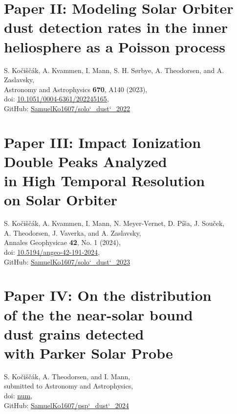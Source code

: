 \documentclass[11pt,twoside,openright]{book}
\begin{document}
\chapter[Paper II: Modeling Solar Orbiter dust detection rates in the inner heliosphere as a Poisson process]{Paper II: Modeling Solar Orbiter dust detection rates in the inner heliosphere as a Poisson process}
S. Ko{\v{c}}i{\v{s}}{\v{c}}{\'a}k, A. Kvammen, I. Mann, S. H. S{\o}rbye, A. Theodorsen, and A. Zaslavsky,\\
Astronomy and Astrophysics {\bf 670}, A140 (2023),\\
doi: \href{https://doi.org/10.1051/0004-6361/202245165}{10.1051/0004-6361/202245165},\\
GitHub: \href{https://zenodo.org/records/8325054}{SamuelKo1607/solo\char`_dust\char`_2022}\\
\newpage\null\newpage



\chapter[Paper III: Impact Ionization Double Peaks Analyzed in High Temporal Resolution on Solar Orbiter]{Paper III: Impact Ionization\\Double Peaks Analyzed\\in High Temporal Resolution\\on Solar Orbiter}
S. Ko{\v{c}}i{\v{s}}{\v{c}}{\'a}k, A. Kvammen, I. Mann, N. Meyer-Vernet, D. P{\'i}{\v{s}}a, J. Sou{\v{c}}ek, \\ A. Theodorsen, J. Vaverka, and A. Zaslavsky,\\
Annales Geophysicae {\bf 42}, No. 1 (2024),\\
doi: \href{https://doi.org/10.5194/angeo-42-191-2024}{10.5194/angeo-42-191-2024},\\
GitHub: \href{https://zenodo.org/records/8325050}{SamuelKo1607/solo\char`_dust\char`_2023}\\
\newpage\null\newpage



\chapter[Paper IV: On the distribution of the the near-solar bound dust grains detected with Parker Solar Probe]{Paper IV: On the distribution\\of the the near-solar bound\\dust grains detected\\with Parker Solar Probe}
S. Ko{\v{c}}i{\v{s}}{\v{c}}{\'a}k, A. Theodorsen, and I. Mann,\\
submitted to Astronomy and Astrophysics,\\
doi: \href{https://doi.org/num}{num},\\
GitHub: \href{https://zenodo.org/records/13254875}{SamuelKo1607/psp\char`_dust\char`_2024}\\
\newpage\null\newpage
%




\end{document}
